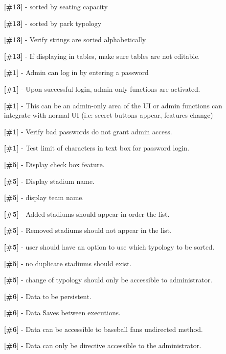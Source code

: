 {\bfseries \mbox{[}\#13\mbox{]}} -\/ sorted by seating capacity

{\bfseries \mbox{[}\#13\mbox{]}} -\/ sorted by park typology

{\bfseries \mbox{[}\#13\mbox{]}} -\/ Verify strings are sorted alphabetically

{\bfseries \mbox{[}\#13\mbox{]}} -\/ If displaying in tables, make sure tables are not editable.

{\bfseries \mbox{[}\#1\mbox{]}} -\/ Admin can log in by entering a password

{\bfseries \mbox{[}\#1\mbox{]}} -\/ Upon successful login, admin-\/only functions are activated.

{\bfseries \mbox{[}\#1\mbox{]}} -\/ This can be an admin-\/only area of the UI or admin functions can integrate with normal UI (i.\+e\+: secret buttons appear, features change)

{\bfseries \mbox{[}\#1\mbox{]}} -\/ Verify bad passwords do not grant admin access.

{\bfseries \mbox{[}\#1\mbox{]}} -\/ Test limit of characters in text box for password login.

{\bfseries \mbox{[}\#5\mbox{]}} -\/ Display check box feature.

{\bfseries \mbox{[}\#5\mbox{]}} -\/ Display stadium name.

{\bfseries \mbox{[}\#5\mbox{]}} -\/ display team name.

{\bfseries \mbox{[}\#5\mbox{]}} -\/ Added stadiums should appear in order the list.

{\bfseries \mbox{[}\#5\mbox{]}} -\/ Removed stadiums should not appear in the list.

{\bfseries \mbox{[}\#5\mbox{]}} -\/ user should have an option to use which typology to be sorted.

{\bfseries \mbox{[}\#5\mbox{]}} -\/ no duplicate stadiums should exist.

{\bfseries \mbox{[}\#5\mbox{]}} -\/ change of typology should only be accessible to administrator.

{\bfseries \mbox{[}\#6\mbox{]}} -\/ Data to be persistent.

{\bfseries \mbox{[}\#6\mbox{]}} -\/ Data Saves between executions.

{\bfseries \mbox{[}\#6\mbox{]}} -\/ Data can be accessible to baseball fans undirected method.

{\bfseries \mbox{[}\#6\mbox{]}} -\/ Data can only be directive accessible to the administrator.

